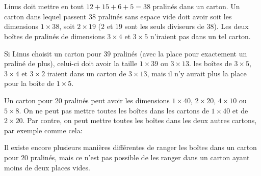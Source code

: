 {{%
\section*{\BrochureSolution}
Linus doit mettre en tout ${12 + 15 + 6 + 5 = 38}$ pralinés dans un carton. Un carton dans lequel passent $38$ pralinés sans espace vide doit avoir soit les dimensions ${1 \times 38}$, soit ${2 \times 19}$ ($2$ et $19$ sont les seuls diviseurs de $38$). Les deux boîtes de pralinés de dimensions ${3 \times 4}$ et ${3 \times 5}$ n’iraient pas dans un tel carton.

{\centering%
\par}

Si Linus choisit un carton pour $39$ pralinés (avec la place pour exactement un praliné de plus), celui-ci doit avoir la taille ${1 \times 39}$ ou ${3 \times 13}$. les boîtes de ${3 \times 5}$, ${3 \times 4}$ et ${3 \times 2}$ iraient dans un carton de ${3 \times 13}$, mais il n’y aurait plus la place pour la boîte de ${1 \times 5}$.

{\centering%
\par}

Un carton pour $20$ pralinés peut avoir les dimensions ${1 \times 40}$, ${2 \times 20}$, ${4 \times 10}$ ou ${5 \times 8}$. On ne peut pas mettre toutes les boîtes dans les cartons de ${1 \times 40}$ et de ${2 \times 20}$. Par contre, on peut mettre toutes les boîtes dans les deux autres cartons, par exemple comme cela:

{\centering%
\raisebox{-0.5ex}{} \raisebox{-0.5ex}{}\par}

Il existe encore plusieurs manières différentes de ranger les boîtes dans un carton pour $20$ pralinés, mais ce n’est pas possible de les ranger dans un carton ayant moins de deux places vides.



}}
